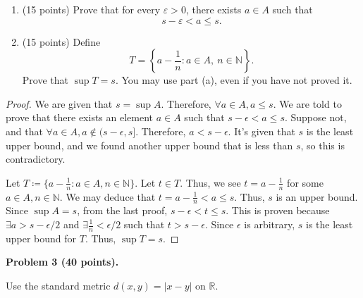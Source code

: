 \documentclass[11pt]{article}
\begin{document}
\begin{enumerate}[label=(\alph*)]
    \item (15 points) Prove that for every $\varepsilon > 0$, there exists $a \in A$ such that
    \[
    s - \varepsilon < a \le s.
    \]
    \item (15 points) Define
    \[
    T = \left\{ a - \frac{1}{n} : a \in A,\ n \in \mathbb{N} \right\}. 
    \]
    Prove that $\sup T = s$. You may use part (a), even if you have not proved it.
\end{enumerate}

\begin{proof}
    We are given that $s = \sup A$. Therefore, $\forall a \in A, a \leq s$. We are told to prove that there exists an element $a \in A$ such that $s-\epsilon < a \leq s$. Suppose not, and that $\forall a \in A, a \not \in(s - \epsilon, s]$. Therefore, $a < s - \epsilon$. It's given that $s$ is the least upper bound, and we found another upper bound that is less than $s$, so this is contradictory. 

    Let $T \coloneq \{ a - \frac{1}{n} : a \in A, n \in \mathbb{N}\}$. Let $t \in T$. Thus, we see $t = a - \frac{1}{n}$ for some $a \in A, n \in \mathbb{N}$. We may deduce that $t = a - \frac{1}{n} < a \leq s$. Thus, $s$ is an upper bound. Since $\sup A = s$, from the last proof, $s-\epsilon < t \leq s$. This is proven because $\exists a > s - \epsilon/2$ and $\exists \frac{1}{n} < \epsilon/2$ such that $t > s - \epsilon$. Since $\epsilon$ is arbitrary, $s$ is the least upper bound for $T$. Thus, $\sup T = s$. 
\end{proof}
\bigskip

\noindent\textbf{Problem 3 (40 points).}

\noindent Use the standard metric $d(x,y) = |x-y|$ on $\mathbb{R}$.
\end{document}
